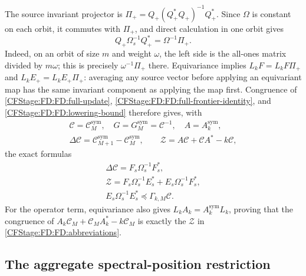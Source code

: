The source invariant projector is
\(\Pi_+=Q_+(Q_+^*Q_+)^{-1}Q_+^*\).  Since \(\Omega\) is constant
on each orbit, it commutes with \(\Pi_+\), and direct calculation in
one orbit gives
\[
Q_+\Omega_s^{-1}Q_+^*=\Omega^{-1}\Pi_+.
\]
Indeed, on an orbit of size \(m\) and weight \(\omega\), the left
side is the all-ones matrix divided by \(m\omega\); this is precisely
\(\omega^{-1}\Pi_+\) there.  Equivariance implies
\(L_kF=L_kF\Pi_+\) and \(L_kE_+=L_kE_+\Pi_+\): averaging any
source vector before applying an equivariant map has the same invariant
component as applying the map first.  Congruence of
\eqref{CFStage:FD:FD:full-update}, \eqref{CFStage:FD:FD:full-frontier-identity}, and
\eqref{CFStage:FD:FD:lowering-bound} therefore gives, with
\begin{equation}
\begin{gathered}
\mathcal C=\mathcal C_M^{\mathrm{sym}},\quad
G=G_M^{\mathrm{sym}}=\mathcal C^{-1},\quad A=A_k^{\mathrm{sym}},\\
\Delta\mathcal C=\mathcal C_{M+1}^{\mathrm{sym}}-
\mathcal C_M^{\mathrm{sym}},\qquad
\mathcal Z=A\mathcal C+\mathcal CA^*-k\mathcal C,
\end{gathered}
\tag{FD.26}\label{CFStage:FD:FD:abbreviations}
\end{equation}
the exact formulas
\begin{equation}
\begin{gathered}
\Delta\mathcal C=F_s\Omega_s^{-1}F_s^*,\\
\mathcal Z=F_s\Omega_s^{-1}E_s^*+E_s\Omega_s^{-1}F_s^*,\\
E_s\Omega_s^{-1}E_s^*\preceq\Gamma_{k,M}\mathcal C.
\end{gathered}
\tag{FD.27}\label{CFStage:FD:FD:restricted-identities}
\end{equation}
For the operator term, equivariance also gives
\(L_kA_k=A_k^{\mathrm{sym}}L_k\), proving that the congruence of
\(A_k\mathcal C_M+\mathcal C_MA_k^*-k\mathcal C_M\) is exactly the
\(\mathcal Z\) in \eqref{CFStage:FD:FD:abbreviations}.

\subsection{The aggregate spectral-position restriction}

